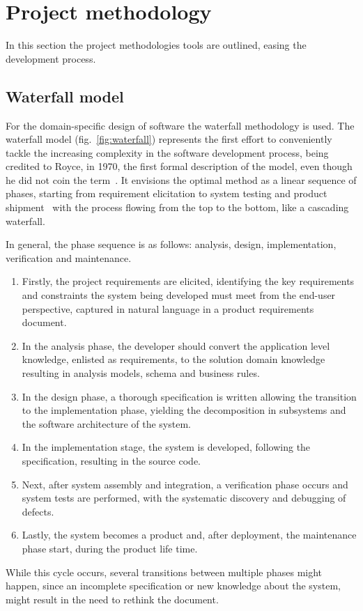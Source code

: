 \section{Project methodology}
\label{sec:proj-meth}
In this section the project methodologies tools are outlined, easing the
development process.

\subsection{Waterfall model}
\label{sec:waterfall-model}
For the domain-specific design of software the waterfall methodology is used.
The waterfall model (fig.~\ref{fig:waterfall}) represents the first effort to
conveniently tackle the increasing complexity in the software development
process, being credited to Royce, in 1970, the first formal description of the
model, even though he did not coin the term~\cite{sommerville1996software}. It
envisions the optimal method
as a linear sequence of phases, starting from requirement elicitation to system
testing and product shipment~\cite{cusumano1995beyond} with the process flowing
from the top to the bottom, like a cascading waterfall.

In general, the phase sequence is as follows: analysis, design, implementation,
verification and maintenance.
\begin{enumerate}
  \item Firstly, the project requirements are elicited, identifying the key
    requirements and constraints the system being developed must meet from the
    end-user perspective, captured in natural language in a product requirements document.
  \item In the analysis phase, the developer should convert the application
    level knowledge, enlisted as requirements, to the solution domain knowledge
    resulting in analysis models, schema and business rules.
  \item In the design phase, a thorough specification is written allowing the
    transition to the implementation phase, yielding the decomposition in
    subsystems and the software architecture of the system. 
  \item In the implementation stage, the system is developed, following the
    specification, resulting in the source code.
  \item Next, after system assembly and integration, a verification phase occurs
    and system tests are performed, with the systematic discovery and debugging
    of defects.
  \item Lastly, the system becomes a product and, after deployment, the
    maintenance phase start, during the product life time.
\end{enumerate}
While this cycle occurs, several transitions between multiple phases might
happen, since an incomplete specification or new knowledge about the system,
might result in the need to rethink the document.

